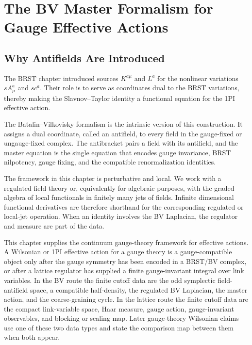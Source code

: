 \chapter{The BV Master Formalism for Gauge Effective Actions}
\label{ch:bv-master-formalism}
\ConventionsMixed


\section{Why Antifields Are Introduced}

The BRST chapter introduced sources \(K^{a\mu}\) and \(L^a\) for the nonlinear
variations \(sA_\mu^a\) and \(sc^a\).  Their role is to serve as coordinates
dual to the BRST variations, thereby making the Slavnov--Taylor identity a
functional equation for the 1PI effective action.

The Batalin--Vilkovisky formalism is the intrinsic version of this
construction.  It assigns a dual coordinate, called an antifield, to every
field in the gauge-fixed or ungauge-fixed complex.  The antibracket pairs a
field with its antifield, and the master equation is the single equation that
encodes gauge invariance, BRST nilpotency, gauge fixing, and the compatible
renormalization identities.

The framework in this chapter is perturbative and local.  We work with a
regulated field theory or, equivalently for algebraic purposes, with the
graded algebra of local functionals in finitely many jets of fields.  Infinite
dimensional functional derivatives are therefore shorthand for the
corresponding regulated or local-jet operation.  When an identity involves the
BV Laplacian, the regulator and measure are part of the data.

This chapter supplies the continuum gauge-theory framework for effective
actions.  A Wilsonian or 1PI effective action for a gauge theory is a
gauge-compatible object only after the gauge symmetry has been encoded in a
BRST/BV complex, or after a lattice regulator has supplied a finite
gauge-invariant integral over link variables.  In the BV route the finite
cutoff data are the odd symplectic field-antifield space, a compatible
half-density, the regulated BV Laplacian, the master action, and the
coarse-graining cycle.  In the lattice route the finite cutoff data are the
compact link-variable space, Haar measure, gauge action, gauge-invariant
observables, and blocking or scaling map.  Later gauge-theory Wilsonian
claims use one of these two data types and state the comparison map between
them when both appear.

